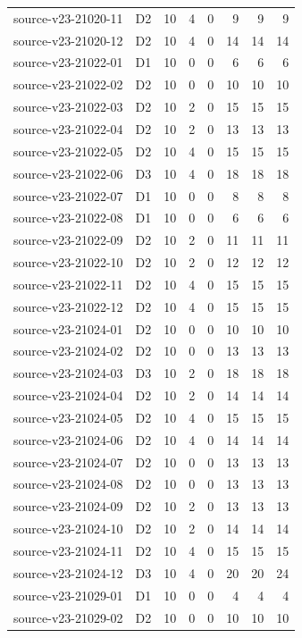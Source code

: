 \begin{longtable}{p{}lrrrrrr}
source-v23-21020-11 & D2 & 10 & 4 & 0 & 9 & 9 & 9\\
source-v23-21020-12 & D2 & 10 & 4 & 0 & 14 & 14 & 14\\
source-v23-21022-01 & D1 & 10 & 0 & 0 & 6 & 6 & 6\\
source-v23-21022-02 & D2 & 10 & 0 & 0 & 10 & 10 & 10\\
source-v23-21022-03 & D2 & 10 & 2 & 0 & 15 & 15 & 15\\
source-v23-21022-04 & D2 & 10 & 2 & 0 & 13 & 13 & 13\\
source-v23-21022-05 & D2 & 10 & 4 & 0 & 15 & 15 & 15\\
source-v23-21022-06 & D3 & 10 & 4 & 0 & 18 & 18 & 18\\
source-v23-21022-07 & D1 & 10 & 0 & 0 & 8 & 8 & 8\\
source-v23-21022-08 & D1 & 10 & 0 & 0 & 6 & 6 & 6\\
source-v23-21022-09 & D2 & 10 & 2 & 0 & 11 & 11 & 11\\
source-v23-21022-10 & D2 & 10 & 2 & 0 & 12 & 12 & 12\\
source-v23-21022-11 & D2 & 10 & 4 & 0 & 15 & 15 & 15\\
source-v23-21022-12 & D2 & 10 & 4 & 0 & 15 & 15 & 15\\
source-v23-21024-01 & D2 & 10 & 0 & 0 & 10 & 10 & 10\\
source-v23-21024-02 & D2 & 10 & 0 & 0 & 13 & 13 & 13\\
source-v23-21024-03 & D3 & 10 & 2 & 0 & 18 & 18 & 18\\
source-v23-21024-04 & D2 & 10 & 2 & 0 & 14 & 14 & 14\\
source-v23-21024-05 & D2 & 10 & 4 & 0 & 15 & 15 & 15\\
source-v23-21024-06 & D2 & 10 & 4 & 0 & 14 & 14 & 14\\
source-v23-21024-07 & D2 & 10 & 0 & 0 & 13 & 13 & 13\\
source-v23-21024-08 & D2 & 10 & 0 & 0 & 13 & 13 & 13\\
source-v23-21024-09 & D2 & 10 & 2 & 0 & 13 & 13 & 13\\
source-v23-21024-10 & D2 & 10 & 2 & 0 & 14 & 14 & 14\\
source-v23-21024-11 & D2 & 10 & 4 & 0 & 15 & 15 & 15\\
source-v23-21024-12 & D3 & 10 & 4 & 0 & 20 & 20 & 24\\
source-v23-21029-01 & D1 & 10 & 0 & 0 & 4 & 4 & 4\\
source-v23-21029-02 & D2 & 10 & 0 & 0 & 10 & 10 & 10\\

\end{longtable}

